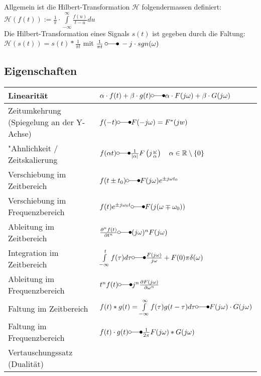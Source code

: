 Allgemein ist die Hilbert-Transformation $\mathcal{H}$ folgendermassen definiert: \\
$\mathcal{H}(f(t)) := \frac{1}{\pi} \cdot \int\limits_{-\infty}^{\infty} \frac{f(u)}{t-u}du$ \\
Die Hilbert-Transformation eines Signals $s(t)$ ist gegeben durch die Faltung: \\
$\mathcal{H}(s(t)) = s(t) * \frac{1}{\pi t}$ mit $\frac{1}{\pi t} \: \laplace \: -j \cdot sgn(\omega)$ \\

\subsection{Eigenschaften}
		\begin{tabular}{|p{8cm}|p{8cm}|}
        	\hline
        	Linearität & 
        	$\alpha\cdot f(t) + \beta\cdot g(t) \laplace \alpha\cdot F(j\omega) +
        	\beta\cdot G(j\omega)$\\
        	\hline
			Zeitumkehrung (Spiegelung an der Y-Achse)&
			$f(-t) \laplace F(-j\omega) = F^*(jw)$ \\
			\hline        	
  			"Ahnlichkeit / Zeitskalierung &
  			$f(\alpha t) \laplace \frac{1}{|\alpha|}F \left (j\frac{\omega}{\alpha} \right)
  			\quad\alpha \in\mathbb{R}\setminus \{0\}$\\
  			\hline
  			Verschiebung im	Zeitbereich &
  			$f(t\pm t_0) \laplace F(j\omega)e^{\pm j\omega t_0}$\\
  			\hline
			Verschiebung im Frequenzbereich &
			$f(t)e^{\pm j\omega_0 t} \laplace F(j(\omega\mp\omega_0))$\\
			\hline
			Ableitung im Zeitbereich &
			$\frac{\partial^n f(t)}{\partial t^n} \laplace (j\omega)^n F(j\omega)$\\
			\hline
			Integration im Zeitbereich &
			$\int\limits_{-\infty}^{t}f(\tau)d\tau \laplace
			\frac{F(j\omega)}{j\omega}+F(0)\pi\delta(\omega)$\\
			\hline				
			Ableitung im Frequenzbereich &
			$t^n f(t) \laplace j^n \frac{\partial F(j\omega)}{\partial \omega^n}$\\
			\hline		
			Faltung im Zeitbereich &
			$f(t) \ast g(t) = \int\limits_{-\infty}^{\infty} f(\tau)g(t-\tau)d\tau \laplace
			F(j\omega) \cdot G(j\omega)$\\
			\hline
			Faltung im Frequenzbereich &
			$f(t) \cdot g(t) \laplace \frac{1}{2\pi}F(j\omega) \ast G(j\omega)$\\
			\hline
			Vertauschungssatz (Dualität) &

\end{tabular}
